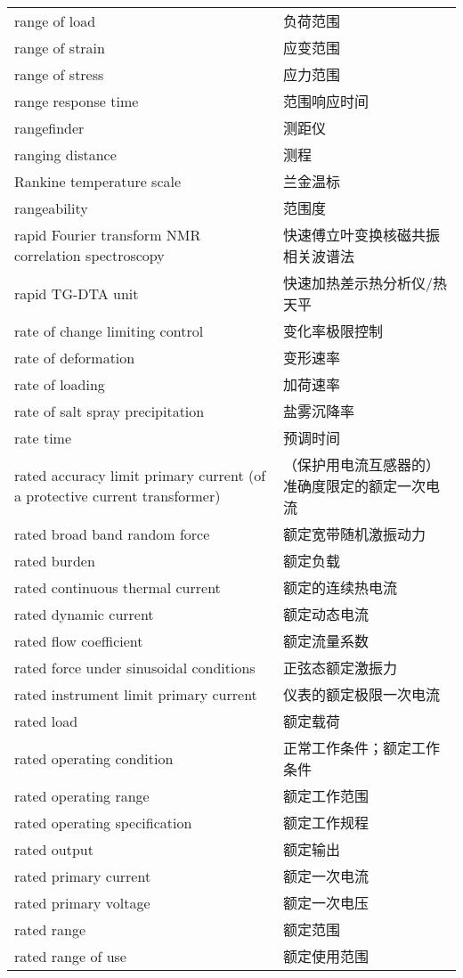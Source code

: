 \documentclass[
]{article}
\begin{document}
\begin{longtable}[]{@{}ll@{}}
range of load & 负荷范围 \\
range of strain & 应变范围 \\
range of stress & 应力范围 \\
range response time & 范围响应时间 \\
rangefinder & 测距仪 \\
ranging distance & 测程 \\
Rankine temperature scale & 兰金温标 \\
rangeability & 范围度 \\
rapid Fourier transform NMR correlation spectroscopy &
快速傅立叶变换核磁共振相关波谱法 \\
rapid TG-DTA unit & 快速加热差示热分析仪/热天平 \\
rate of change limiting control & 变化率极限控制 \\
rate of deformation & 变形速率 \\
rate of loading & 加荷速率 \\
rate of salt spray precipitation & 盐雾沉降率 \\
rate time & 预调时间 \\
rated accuracy limit primary current (of a protective current
transformer) & （保护用电流互感器的）准确度限定的额定一次电流 \\
rated broad band random force & 额定宽带随机激振动力 \\
rated burden & 额定负载 \\
rated continuous thermal current & 额定的连续热电流 \\
rated dynamic current & 额定动态电流 \\
rated flow coefficient & 额定流量系数 \\
rated force under sinusoidal conditions & 正弦态额定激振力 \\
rated instrument limit primary current & 仪表的额定极限一次电流 \\
rated load & 额定载荷 \\
rated operating condition & 正常工作条件；额定工作条件 \\
rated operating range & 额定工作范围 \\
rated operating specification & 额定工作规程 \\
rated output & 额定输出 \\
rated primary current & 额定一次电流 \\
rated primary voltage & 额定一次电压 \\
rated range & 额定范围 \\
rated range of use & 额定使用范围 \\

\end{longtable}
\end{document}
